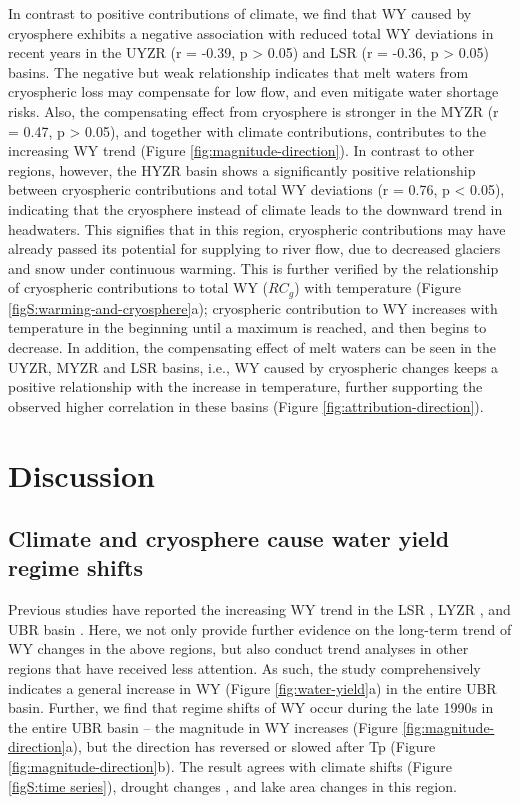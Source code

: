 \documentclass[hess, manuscript]{copernicus}
\begin{document}
In contrast to positive contributions of climate, we find that WY caused by cryosphere exhibits a negative association with reduced total WY deviations in recent years in the UYZR (r = -0.39, p > 0.05) and LSR (r = -0.36, p > 0.05) basins. The negative but weak relationship indicates that melt waters from cryospheric loss may compensate for low flow, and even mitigate water shortage risks. Also, the compensating effect from cryosphere is stronger in the MYZR (r = 0.47, p > 0.05), and together with climate contributions, contributes to the increasing WY trend (Figure \ref{fig:magnitude-direction}). In contrast to other regions, however, the HYZR basin shows a significantly positive relationship between cryospheric contributions and total WY deviations (r = 0.76, p < 0.05), indicating that the cryosphere instead of climate leads to the downward trend in headwaters. This signifies that in this region, cryospheric contributions may have already passed its potential for supplying to river flow, due to decreased glaciers and snow under continuous warming. This is further verified by the relationship of cryospheric contributions to total WY ($RC_g$) with temperature (Figure \ref{figS:warming-and-cryosphere}a); cryospheric contribution to WY increases with temperature in the beginning until a maximum is reached, and then begins to decrease. In addition, the compensating effect of melt waters can be seen in the UYZR, MYZR and LSR basins, i.e., WY caused by cryospheric changes keeps a positive relationship with the increase in temperature, further supporting the observed higher correlation in these basins (Figure \ref{fig:attribution-direction}).

\section{Discussion}

\subsection{Climate and cryosphere cause water yield regime shifts}
Previous studies have reported the increasing WY trend in the LSR \citep{linhess2020}, LYZR \citep{zhangech2011}, and UBR basin \citep{li2021vegetation}. Here, we not only provide further evidence on the long-term trend of WY changes in the above regions, but also conduct trend analyses in other regions that have received less attention. As such, the study comprehensively indicates a general increase in WY (Figure \ref{fig:water-yield}a) in the entire UBR basin. Further, we find that regime shifts of WY occur during the late 1990s in the entire UBR basin -- the magnitude in WY increases (Figure \ref{fig:magnitude-direction}a), but the direction has reversed or slowed after Tp (Figure \ref{fig:magnitude-direction}b). The result agrees with climate shifts (Figure \ref{figS:time series}), drought changes \citep{li2019spatiotemporal}, and lake area changes \citep{zhang2017} in this region.
\end{document}
